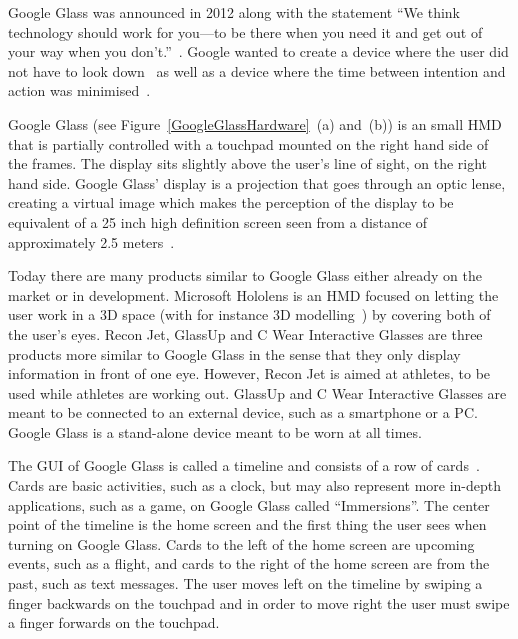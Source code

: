 Google Glass was announced in 2012 along with the statement ``We think technology should work for you---to be there when you need it and get out of your way when you don't.''~\cite{GoogleGlassAnnouncement}. Google wanted to create a device where the user did not have to look down~\cite{tedtalkWhyGlass} as well as a device where the time between intention and action was minimised~\cite{6504855}. 

Google Glass (see Figure~\ref{GoogleGlassHardware}~(a) and~(b)) is an small HMD that is partially controlled with a touchpad mounted on the right hand side of the frames. The display sits slightly above the user's line of sight, on the right hand side. Google Glass' display is a projection that goes through an optic lense, creating a virtual image which makes the perception of the display to be equivalent of a 25 inch high definition screen seen from a distance of approximately 2.5 meters~\cite{GlassSpecs}.

Today there are many products similar to Google Glass either already on the market or in development. Microsoft Hololens is an HMD focused on letting the user work in a 3D space (with for instance 3D modelling~\cite{hololensDemo}) by covering both of the user's eyes. Recon Jet, GlassUp and C Wear Interactive Glasses are three products more similar to Google Glass in the sense that they only display information in front of one eye. However, Recon Jet is aimed at athletes, to be used while athletes are working out. GlassUp and C Wear Interactive Glasses are meant to be connected to an external device, such as a smartphone or a PC. Google Glass is a stand-alone device meant to be worn at all times.

The GUI of Google Glass is called a timeline and consists of a row of cards~\cite{ImagesGoogleGlassUI}. Cards are basic activities, such as a clock, but may also represent more in-depth applications, such as a game, on Google Glass called ``Immersions''. The center point of the timeline is the home screen and the first thing the user sees when turning on Google Glass. Cards to the left of the home screen are upcoming events, such as a flight, and cards to the right of the home screen are from the past, such as text messages. The user moves left on the timeline by swiping a finger backwards on the touchpad and in order to move right the user must swipe a finger forwards on the touchpad. 

